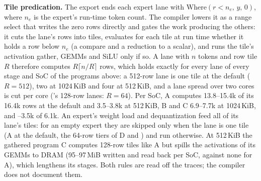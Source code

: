 \textbf{Tile predication.} The export ends each expert lane with $\mathrm{Where}(r<n_e,\,y,\,0)$, where $n_e$ is the
expert's run-time token count. The compiler lowers it as a range select that writes the zero rows directly and gates the
work producing the others: it cuts the lane's rows into tiles, evaluates for each tile at run time whether it holds a row
below $n_e$ (a compare and a reduction to a scalar), and runs the tile's activation gather, GEMMs and SiLU only if so. A lane
with $n$ tokens and row tile $R$ therefore computes $R\lceil n/R\rceil$ rows, which holds exactly for every lane of every
stage and SoC of the programs above: a 512-row lane is one tile at the default ($R=512$), two at 1024\,KiB and four at
512\,KiB, and a lane spread over two cores is cut per core (\sys's 128-row lanes: $R=64$). Per SoC, A computes 13.8--15.4k
of its 16.4k rows at the default and 3.5--3.8k at 512\,KiB, B and C 6.9--7.7k at 1024\,KiB, and --3.5k of 6.1k.
An expert's weight load and dequantization feed all of its lane's tiles: for an empty expert they are skipped only when the
lane is one tile (A at the default, the 64-row tiers of D and \sys) and run otherwise. At 512\,KiB the gathered program C
computes 128-row tiles like A but spills the activations of its GEMMs to DRAM (95--97\,MiB written and read back per SoC,
against none for A), which lengthens its stages. Both rules are read off the traces; the compiler does not document them.
